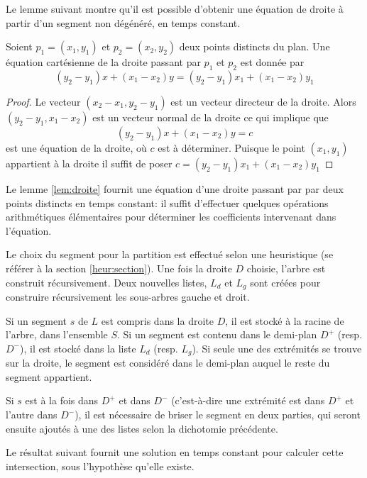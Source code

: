 Le lemme suivant montre qu'il est possible d'obtenir une équation de droite
à partir d'un segment non dégénéré, en temps constant.

\begin{lem}\label{lem:droite}
  Soient $p_1 = (x_1, y_1)$ et $p_2 = (x_2, y_2)$ deux points distincts du
  plan. Une équation cartésienne de la droite  passant par $p_1$ et $p_2$
  est donnée par
  \begin{equation}
    \left(y_2 - y_1\right) x + \left(x_1 - x_2\right) y =
    \left(y_2 - y_1\right) x_1 + \left(x_1 - x_2\right) y_1
  \end{equation}
\end{lem}
\begin{proof}
  Le vecteur $(x_2 - x_1, y_2 - y_1)$ est un vecteur directeur de la droite.
  Alors $(y_2 - y_1, x_1 - x_2)$ est un vecteur normal de la droite ce qui
  implique que
  $$\left(y_2 - y_1\right) x + \left(x_1 - x_2\right) y = c$$ est une équation
  de la droite, où $c$ est à déterminer.
  Puisque le point $(x_1, y_1)$ appartient à la droite il suffit de poser
  $c = \left(y_2 - y_1\right) x_1 + \left(x_1 - x_2\right) y_1$
\end{proof}

Le lemme \ref{lem:droite} fournit une équation d'une droite passant par
par deux points distincts en temps constant: il suffit d'effectuer
quelques opérations arithmétiques élémentaires pour déterminer les
coefficients intervenant dans l'équation.

Le choix du segment
pour la partition est effectué selon une heuristique (se référer à la section
\ref{heur:section}).
Une fois la droite $D$ choisie, l'arbre est construit récursivement.
Deux nouvelles listes, $L_d$ et $L_g$ sont créées pour construire récursivement
les sous-arbres gauche et droit.

Si un segment $s$ de $L$ est compris dans la droite $D$, il est stocké à
la racine de l'arbre, dans l'ensemble $S$. Si un segment est contenu dans
le demi-plan $D^+$ (resp. $D^-$), il est stocké dans la liste $L_d$ (resp.
$L_g$). Si seule une des extrémités se trouve sur la droite, le segment
est considéré dans le demi-plan auquel le reste du segment appartient.

Si $s$ est à la fois dans $D^+$ et dans $D^-$ (c'est-à-dire une
extrémité est dans $D^+$ et l'autre dans $D^-$), il est nécessaire
de briser le segment en deux parties, qui seront ensuite ajoutés à une des
listes selon la dichotomie précédente.

Le résultat suivant fournit une solution en temps constant pour calculer
cette intersection, sous l'hypothèse qu'elle existe.

